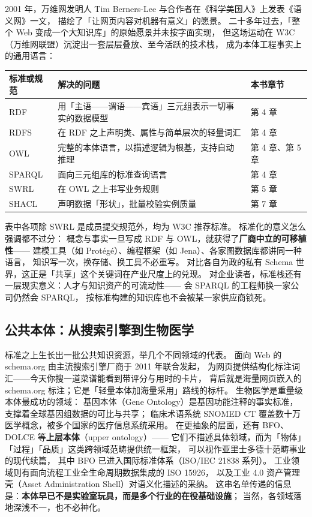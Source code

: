 2001 年，万维网发明人 Tim Berners-Lee 与合作者在《科学美国人》上发表《语义网》一文，
描绘了「让网页内容对机器有意义」的愿景。
二十多年过去，「整个 Web 变成一个大知识库」的原始愿景并未按字面实现，
但这场运动在 W3C（万维网联盟）沉淀出一套层层叠放、至今活跃的技术栈，
成为本体工程事实上的通用语言：

\begin{center}
\begin{tabularx}{\linewidth}{@{}lXX@{}}
\toprule
\textbf{标准或规范} & \textbf{解决的问题} & \textbf{本书章节} \\
\midrule
RDF & 用「主语——谓语——宾语」三元组表示一切事实的数据模型 & 第 4 章 \\
RDFS & 在 RDF 之上声明类、属性与简单层次的轻量词汇 & 第 4 章 \\
OWL & 完整的本体语言，以描述逻辑为根基，支持自动推理 & 第 4 章、第 5 章 \\
SPARQL & 面向三元组库的标准查询语言 & 第 4 章 \\
SWRL & 在 OWL 之上书写业务规则 & 第 5 章 \\
SHACL & 声明数据「形状」，批量校验实例质量 & 第 7 章 \\
\bottomrule
\end{tabularx}
\end{center}

表中各项除 SWRL 是成员提交规范外，均为 W3C 推荐标准。
标准化的意义怎么强调都不过分：
概念与事实一旦写成 RDF 与 OWL，就获得了\textbf{厂商中立的可移植性}——
建模工具（如 Protégé）、编程框架（如 Jena）、各家图数据库都讲同一种语言，
知识写一次，换存储、换工具不必重写。
对比各自为政的私有 Schema 世界，这正是「共享」这个关键词在产业尺度上的兑现。
对企业读者，标准栈还有一层现实意义：人才与知识资产的可流动性——
会 SPARQL 的工程师换一家公司仍然会 SPARQL，
按标准构建的知识库也不会被某一家供应商锁死。

\subsection{公共本体：从搜索引擎到生物医学}

标准之上生长出一批公共知识资源，举几个不同领域的代表。
面向 Web 的 schema.org 由主流搜索引擎厂商于 2011 年联合发起，
为网页提供结构化标注词汇——今天你搜一道菜谱能看到带评分与用时的卡片，
背后就是海量网页嵌入的 schema.org 标注；它是「轻量本体加海量采用」路线的标杆。
生物医学是重量级本体最成功的领域：
基因本体（Gene Ontology）是基因功能注释的事实标准，
支撑着全球基因组数据的可比与共享；
临床术语系统 SNOMED CT 覆盖数十万医学概念，被多个国家的医疗信息系统采用。
在更抽象的层面，还有 BFO、DOLCE 等\textbf{上层本体}（upper ontology）——
它们不描述具体领域，而为「物体」「过程」「品质」这类跨领域范畴提供统一框架，
可以视作亚里士多德十范畴事业的现代续篇，
其中 BFO 已进入国际标准体系（ISO/IEC 21838 系列）。
工业领域则有面向流程工业全生命周期数据集成的 ISO 15926，
以及工业 4.0 资产管理壳（Asset Administration Shell）对语义化描述的采纳。
这串名单传递的信息是：\textbf{本体早已不是实验室玩具，而是多个行业的在役基础设施}；
当然，各领域落地深浅不一，也不必神化。

